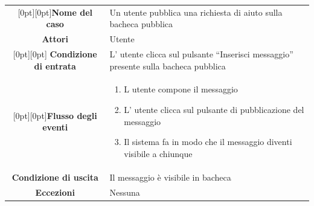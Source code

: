 \documentclass[a4paper,12pt]{article}
\begin{document}
\begin{tabularx}{\textwidth}{|c|X|}
\rowcolor[gray]{.9}\hline  \raisebox{-1ex}[0pt][0pt]{\textbf{Nome del caso}} & Un utente pubblica una richiesta di aiuto sulla bacheca pubblica \\
\rowcolor[gray]{.9}\hline  \textbf{Attori} & Utente \\ 
\rowcolor[gray]{.9}\hline \raisebox{-1ex}[0pt][0pt]{ \textbf{Condizione di entrata}} & L' utente clicca sul pulsante “Inserisci messaggio” presente sulla bacheca pubblica \\
\rowcolor[gray]{.9}\hline  \raisebox{-8ex}[0pt][0pt]{\textbf{Flusso degli eventi}} & 
\begin{enumerate}
\itemsep0em 
\item L utente compone il messaggio
\item L' utente clicca sul pulsante di pubblicazione del messaggio
\item Il sistema fa in modo che il messaggio diventi visibile a chiunque
\end{enumerate}
 \\ 
\rowcolor[gray]{.9}\hline \textbf{Condizione di uscita} & Il messaggio è visibile in bacheca \\
\rowcolor[gray]{.9}\hline \textbf{Eccezioni} & Nessuna
\\
\hline 
\end{tabularx} \\[1\baselineskip]
\end{document}
